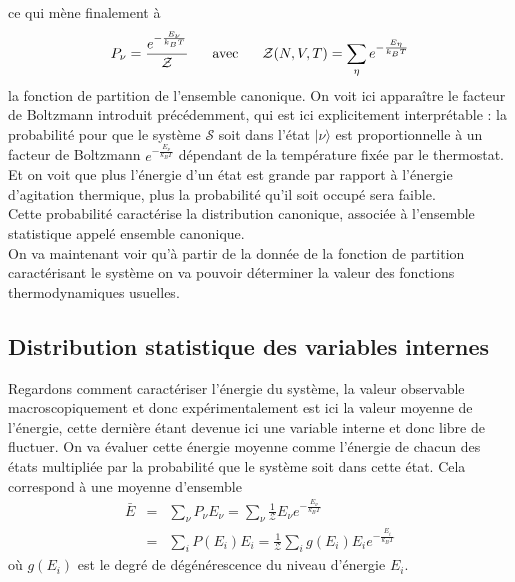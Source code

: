 \documentclass[12pt,prb,aps,epsf]{article}
\begin{document}
ce qui mène finalement à 
\begin{eqnarray}
P_{\nu} = \frac{e^{-\frac{E_{\nu}}{k_BT}}}{\mathcal{Z}}\hspace{0.6cm} \mathrm{avec}\hspace{0.6cm} \mathcal{Z}(N,V,T) = \sum_{\eta}e^{-\frac{E_{\eta}}{k_BT}}
\end{eqnarray}
la fonction de partition de l'ensemble canonique.
On voit ici apparaître le facteur de Boltzmann introduit précédemment, qui est ici explicitement interprétable : la probabilité pour que le système $\mathcal{S}$ soit dans l'état $|\nu\rangle$ est proportionnelle à un facteur de Boltzmann $e^{-\frac{E_{\nu}}{k_BT}}$ dépendant de la température fixée par le thermostat. Et on voit que plus l'énergie d'un état est grande par rapport à l'énergie d'agitation thermique, plus la probabilité qu'il soit occupé sera faible.\\
Cette probabilité caractérise la distribution canonique, associée à l'ensemble statistique appelé ensemble canonique.\\
On va maintenant voir qu'à partir de la donnée de la fonction de partition caractérisant le système on va pouvoir déterminer la valeur des fonctions thermodynamiques usuelles.

\subsection{Distribution statistique des variables internes}

Regardons comment caractériser l'énergie du système, la valeur observable macroscopiquement et donc expérimentalement est ici la valeur moyenne de l'énergie, cette dernière étant devenue ici une variable interne et donc libre de fluctuer. On va évaluer cette énergie moyenne comme l'énergie de chacun des états multipliée par la probabilité que le système soit dans cette état. Cela correspond à une moyenne d'ensemble
\begin{eqnarray}
\bar{E} &=& \sum_{\nu} P_{\nu}E_{\nu} = \sum_{\nu}\frac{1}{\mathcal{Z}} E_{\nu} e^{-\frac{E_{\nu}}{k_BT}}\\ 
&=& \sum_i P(E_i) E_i = \frac{1}{\mathcal{Z}}  \sum_i g(E_i)E_ie^{-\frac{E_{i}}{k_BT}}
\end{eqnarray}
où $g(E_i)$ est le degré de dégénérescence du niveau d'énergie $E_i$.\\
\end{document}
